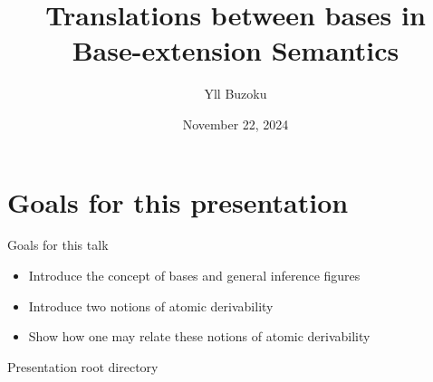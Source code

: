 \documentclass{beamer}
\title[B-eS for ILL]{Translations between bases in Base-extension Semantics}
\author{Yll Buzoku}
\institute[UCL]{%
  Department of Computer Science \\ %
  University College London
}
\date{November 22, 2024}
\begin{document}
\begin{frame}
\titlepage
\end{frame}
\section*{Goals for this presentation}
\begin{frame}{Goals for this talk}
\begin{itemize}
\item Introduce the concept of bases and general inference figures
\item Introduce two notions of atomic derivability
\item Show how one may relate these notions of atomic derivability
\end{itemize}
\end{frame}
\begin{frame}{Presentation root directory}
\tableofcontents
\end{frame}
\end{document}
